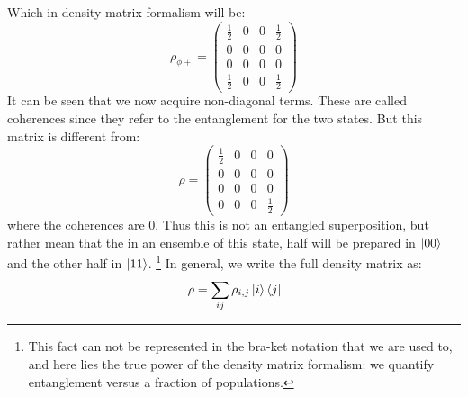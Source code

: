 Which in density matrix formalism will be:
\begin{equation}
    \rho_{\phi+} = 
    \begin{pmatrix}
        \frac{1}{2} & 0 & 0 & \frac{1}{2} \\
        0 & 0 & 0 & 0 \\
        0 & 0 & 0 & 0 \\
        \frac{1}{2} & 0 & 0 & \frac{1}{2}
    \end{pmatrix}
\end{equation}
It can be seen that we now acquire non-diagonal terms. These are called coherences since they refer to the entanglement for the two states.  But this matrix is different from: 
\begin{equation}
    \rho = 
    \begin{pmatrix}
        \frac{1}{2} & 0 & 0 & 0 \\
        0 & 0 & 0 & 0 \\
        0 & 0 & 0 & 0 \\
        0 & 0 & 0 & \frac{1}{2}
    \end{pmatrix}
\end{equation}
where the coherences are $0$. Thus this is not an entangled superposition, but rather mean that the in an ensemble of this state, half will be prepared in $\ket{00}$ and the other half in $\ket{11}$. \footnote{This fact can not be represented in the bra-ket notation that we are used to, and here lies the true power of the density matrix formalism: we quantify entanglement versus a fraction of populations.}
In general, we write the full density matrix as:
\begin{equation}
    \rho = \sum_{ij} \rho_{i,j} \ket{i}\bra{j}
\end{equation}

